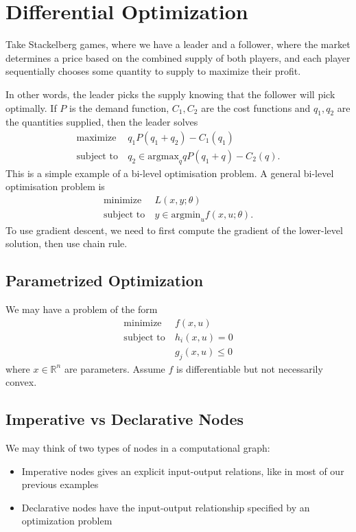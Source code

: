 \documentclass[11pt]{article}
\begin{document}
\newpage 
\section{Differential Optimization} 
Take Stackelberg games, where we have a leader and a follower, where the market determines a price based on the combined supply of both players, and each player sequentially chooses some quantity to supply to maximize their profit. \par
In other words, the leader picks the supply knowing that the follower will pick optimally. If $P$ is the demand function, $C_1, C_2$ are the cost functions and $q_1, q_2$ are the quantities supplied, then the leader solves 
\begin{align*}
    \text{maximize}~& q_1 P(q_1 + q_2) - C_1(q_1) \\ 
    \text{subject to}~&q_2 \in \mathrm{argmax}_q qP(q_1 + q) - C_2(q).
\end{align*}
This is a simple example of a bi-level optimisation problem. A general bi-level optimisation problem is
\begin{align*}
    \text{minimize}~&L(x, y; \theta) \\ 
    \text{subject to}~&y \in \mathrm{argmin}_u f(x, u; \theta).
\end{align*}
To use gradient descent, we need to first compute the gradient of the lower-level solution, then use chain rule.

\subsection{Parametrized Optimization} 
We may have a problem of the form 
\begin{align*}
    \text{minimize}~&f(x, u) \\
    \text{subject to}~&h_i(x, u) = 0 \\
    &g_j(x, u) \leq 0
\end{align*}
where $x \in \mathbb{R}^n$ are parameters. Assume $f$ is differentiable but not necessarily convex. 

\subsection{Imperative vs Declarative Nodes} 
We may think of two types of nodes in a computational graph:
\begin{itemize}
    \item Imperative nodes gives an explicit input-output relations, like in most of our previous examples
    \item Declarative nodes have the input-output relationship specified by an optimization problem
\end{itemize}
\end{document}

